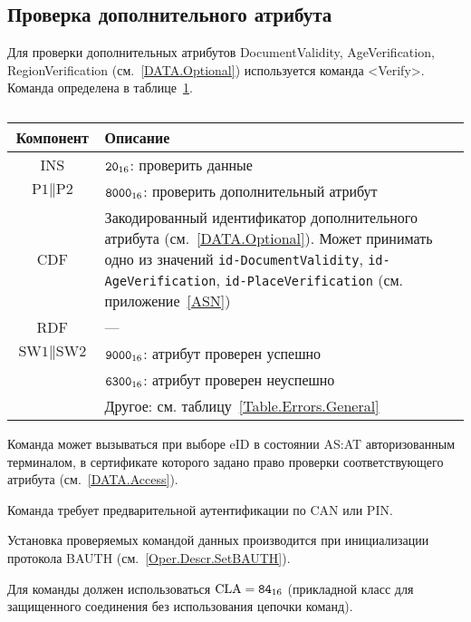 \subsection{Проверка дополнительного атрибута}
\label{Oper.Descr.VerifyData}

Для проверки дополнительных атрибутов DocumentValidity, AgeVerification, 
RegionVerification (см.~\ref{DATA.Optional}) используется команда  <Verify>. 
Команда определена в таблице~\ref{Table.Oper.VerifyDataCmd}.

\begin{table}[hbt]
\caption{}\label{Table.Oper.VerifyDataCmd}
\begin{tabular}{|c|p{14cm}|}
\hline
Компонент & Описание \\
\hline
\hline
INS & $\texttt{20}_{16}$: проверить данные\\
\hline
$\text{P1} \parallel \text{P2}$ & $\texttt{8000}_{16}$: 
проверить дополнительный атрибут\\
\hline
CDF & Закодированный идентификатор дополнительного атрибута 
(см.~\ref{DATA.Optional}). 
Может принимать одно из значений 
\verb|id-DocumentValidity|, \verb|id-AgeVerification|, \verb|id-PlaceVerification| 
(см. приложение~\ref{ASN})\\
\hline 
RDF &  --- \\
\hline
$\text{SW1} \parallel \text{SW2}$ & $\texttt{9000}_{16}$: атрибут проверен успешно\\
\cline{2-2}
 & $\texttt{6300}_{16}$: атрибут проверен неуспешно\\
\cline{2-2}
 & Другое: см. таблицу~\ref{Table.Errors.General} \\
\hline
\end{tabular}
\end{table}

Команда может вызываться при выборе eID в состоянии AS:AT
авторизованным терминалом, в сертификате которого задано право
проверки соответствующего атрибута (см.~\ref{DATA.Access}).  

Команда требует предварительной аутентификации по CAN или PIN.

Установка проверяемых командой данных производится 
при инициализации протокола BAUTH (см.~\ref{Oper.Descr.SetBAUTH}).  

Для команды должен использоваться $\text{CLA}=\texttt{84}_{16}$ 
(прикладной класс для защищенного соединения без использования цепочки 
команд). 


